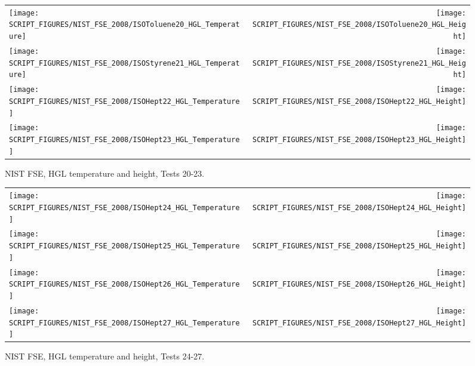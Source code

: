 \begin{figure}[p]
\begin{tabular*}{\textwidth}{l@{\extracolsep{\fill}}r}
\texttt{[image: SCRIPT\_FIGURES/NIST\_FSE\_2008/ISOToluene20\_HGL\_Temperature]} &
\texttt{[image: SCRIPT\_FIGURES/NIST\_FSE\_2008/ISOToluene20\_HGL\_Height]} \\
\texttt{[image: SCRIPT\_FIGURES/NIST\_FSE\_2008/ISOStyrene21\_HGL\_Temperature]} &
\texttt{[image: SCRIPT\_FIGURES/NIST\_FSE\_2008/ISOStyrene21\_HGL\_Height]} \\
\texttt{[image: SCRIPT\_FIGURES/NIST\_FSE\_2008/ISOHept22\_HGL\_Temperature]} &
\texttt{[image: SCRIPT\_FIGURES/NIST\_FSE\_2008/ISOHept22\_HGL\_Height]} \\
\texttt{[image: SCRIPT\_FIGURES/NIST\_FSE\_2008/ISOHept23\_HGL\_Temperature]} &
\texttt{[image: SCRIPT\_FIGURES/NIST\_FSE\_2008/ISOHept23\_HGL\_Height]}
\end{tabular*}
\caption[NIST FSE, HGL temperature and height, Tests 20-23]
{NIST FSE, HGL temperature and height, Tests 20-23.}
\label{NIST_FSE_2008_HGL_Temp_4}
\end{figure}

\begin{figure}[p]
\begin{tabular*}{\textwidth}{l@{\extracolsep{\fill}}r}
\texttt{[image: SCRIPT\_FIGURES/NIST\_FSE\_2008/ISOHept24\_HGL\_Temperature]} &
\texttt{[image: SCRIPT\_FIGURES/NIST\_FSE\_2008/ISOHept24\_HGL\_Height]} \\
\texttt{[image: SCRIPT\_FIGURES/NIST\_FSE\_2008/ISOHept25\_HGL\_Temperature]} &
\texttt{[image: SCRIPT\_FIGURES/NIST\_FSE\_2008/ISOHept25\_HGL\_Height]} \\
\texttt{[image: SCRIPT\_FIGURES/NIST\_FSE\_2008/ISOHept26\_HGL\_Temperature]} &
\texttt{[image: SCRIPT\_FIGURES/NIST\_FSE\_2008/ISOHept26\_HGL\_Height]} \\
\texttt{[image: SCRIPT\_FIGURES/NIST\_FSE\_2008/ISOHept27\_HGL\_Temperature]} &
\texttt{[image: SCRIPT\_FIGURES/NIST\_FSE\_2008/ISOHept27\_HGL\_Height]}
\end{tabular*}
\caption[NIST FSE, HGL temperature and height, Tests 24-27]
{NIST FSE, HGL temperature and height, Tests 24-27.}
\label{NIST_FSE_2008_HGL_Temp_5}
\end{figure}

